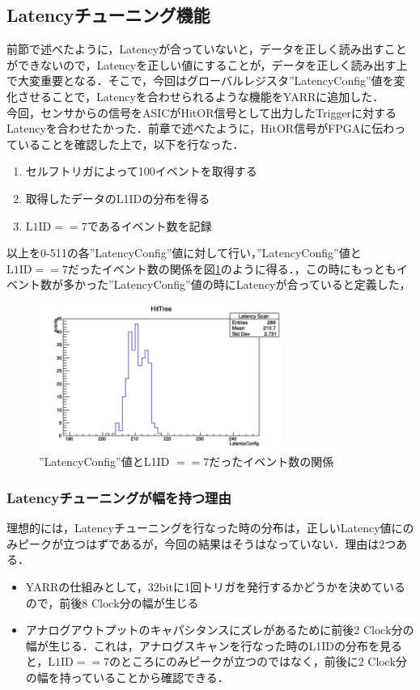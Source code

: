 \subsection{Latencyチューニング機能}
前節で述べたように，Latencyが合っていないと，データを正しく読み出すことができないので，Latencyを正しい値にすることが，データを正しく読み出す上で大変重要となる．そこで，今回はグローバルレジスタ''LatencyConfig''値を変化させることで，Latencyを合わせられるような機能をYARRに追加した．\\
今回，センサからの信号をASICがHitOR信号として出力したTriggerに対するLatencyを合わせたかった．前章で述べたように，HitOR信号がFPGAに伝わっていることを確認した上で，以下を行なった．
\begin{enumerate}
\item セルフトリガによって100イベントを取得する
\item 取得したデータのL1IDの分布を得る
\item $\mathrm{L1ID} == 7$であるイベント数を記録
\end{enumerate}
以上を0-511の各''LatencyConfig''値に対して行い，''LatencyConfig''値と$\mathrm{L1ID} == 7$だったイベント数の関係を図\ref{fig:latencydist}のように得る．，この時にもっともイベント数が多かった''LatencyConfig''値の時にLatencyが合っていると定義した，

\begin{figure}[h]
  \centering
  \includegraphics[width=8cm]{./figure/latencydist.png}
  \caption{''LatencyConfig''値とL1ID $== 7$だったイベント数の関係}
  \label{fig:latencydist}
\end{figure}


\subsubsection{Latencyチューニングが幅を持つ理由}
理想的には，Latencyチューニングを行なった時の分布は，正しいLatency値にのみピークが立つはずであるが，今回の結果はそうはなっていない．理由は2つある．
\begin{itemize}
\item YARRの仕組みとして，32bitに1回トリガを発行するかどうかを決めているので，前後8 $\mathrm{Clock}$分の幅が生じる
\item アナログアウトプットのキャパシタンスにズレがあるために前後2 $\mathrm{Clock}$分の幅が生じる．これは，アナログスキャンを行なった時のL1IDの分布を見ると，$\mathrm{L1ID} == 7$のところにのみピークが立つのではなく，前後に2 $\mathrm{Clock}$分の幅を持っていることから確認できる．
\end{itemize}

